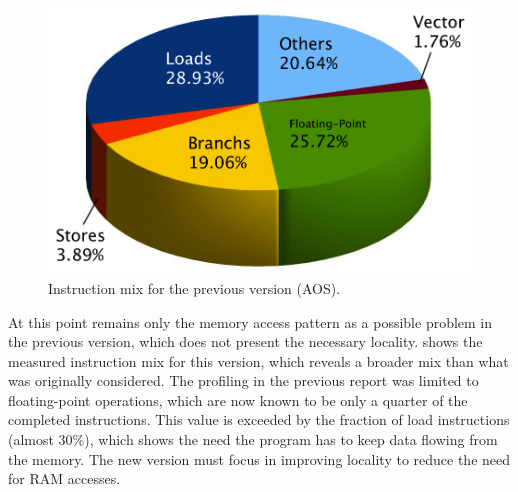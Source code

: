 \documentclass[abstract=on,9pt,twocolumn]{scrartcl}
\begin{document}
\begin{figure}[!p]
	\begin{center}
		\includegraphics[width=\columnwidth]{images/report.april/instmxAOS.png}
	\end{center}
	\caption{Instruction mix for the previous version (AOS).}
	\label{fig:instmxAOS}
\end{figure}

At this point remains only the memory access pattern as a possible problem in the previous version, which does not present the necessary locality.  shows the measured instruction mix for this version, which reveals a broader mix than what was originally considered. The profiling in the previous report was limited to floating-point operations, which are now known to be only a quarter of the completed instructions. This value is exceeded by the fraction of load instructions (almost 30\%), which shows the need the program has to keep data flowing from the memory. The new version must focus in improving locality to reduce the need for RAM accesses.
\end{document}
